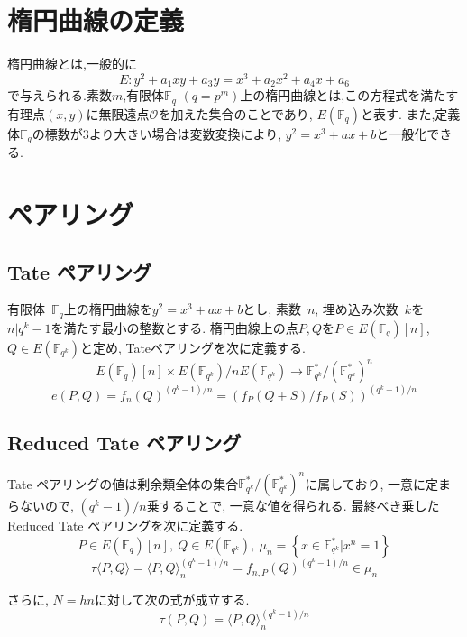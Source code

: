 \documentclass[twocolumn]{jsarticle} %
\begin{document}
\section{楕円曲線の定義}
楕円曲線とは,一般的に
\vspace{-2mm}
\[E:y^2+a_1xy+a_3y=x^3+a_2x^2+a_4x+a_6\]
で与えられる.素数$m$,有限体$\mathbb {F}_q$ $(q=p^m)$上の楕円曲線とは,この方程式を満たす有理点$(x,y)$に無限遠点$\mathcal{O}$を加えた集合のことであり, $E(\mathbb {F}_q)$と表す. また,定義体$\mathbb {F}_q$の標数が3より大きい場合は変数変換により, $y^2=x^3+ax+b$と一般化できる.
\section{ペアリング}
\subsection{Tate ペアリング}
有限体\ $\mathbb{F}_q$上の楕円曲線を$y^2=x^3+ax+b$とし, 素数\ $n$, 埋め込み次数\ $k$を$n|q^k-1$を満たす最小の整数とする. 楕円曲線上の点$P,Q$を$P\in E(\mathbb{F}_q)[n]$,\ $Q\in E(\mathbb{F}_{q^k})$と定め, Tateペアリングを次に定義する.
\vspace{-2mm}
\[E(\mathbb{F}_q)[n]\times E(\mathbb{F}_{q^k})/nE(\mathbb{F}_{q^k})\rightarrow \mathbb{F}_{q^k}^{*}/(\mathbb{F}_{q^k}^{*})^n\]
\vspace{-8mm}
\[e(P,Q)=f_{n}(Q)^{{(q^k-1)/n}}=(f_P(Q+S)/f_P(S))^{(q^k-1)/n}\]
\subsection{Reduced Tate ペアリング}
Tate ペアリングの値は剰余類全体の集合$\mathbb{F}_{q^k}^\ast/(\mathbb{F}_{q^k}^\ast)^n$に属しており, 一意に定まらないので, $(q^k - 1) / n$乗することで, 一意な値を得られる. 最終べき乗したReduced Tate ペアリングを次に定義する.
\vspace{-2mm}
\[P \in E(\mathbb{F}_q)[n],\ Q \in E(\mathbb{F}_{q^k}),\ \mu_n = \left\{ x \in \mathbb{F}_{q^k}^\ast | x^n = 1 \right\}\]
\vspace{-4mm}
\[\tau \langle P,Q \rangle = \langle P,Q \rangle _n^{(q^k - 1) / n} = f_{n,P}(Q)^{(q^k - 1) / n} \in \mu_n\]
\par
\vspace{-2mm}
さらに, $N = hn$に対して次の式が成立する.
\vspace{-2mm}
\[
\tau(P,Q) = \langle P,Q \rangle _n^{(q^k - 1) / n}
\]
\vspace{-7mm}
\end{document}
